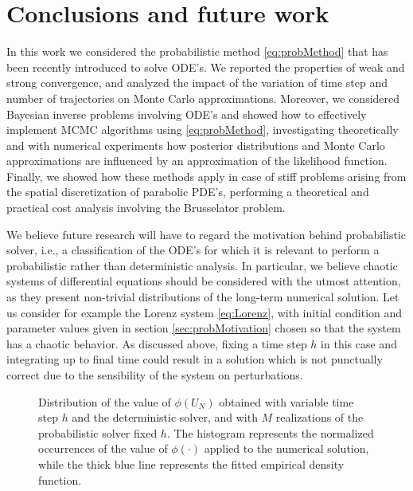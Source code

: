 \section{Conclusions and future work}

In this work we considered the probabilistic method \eqref{eq:probMethod} that has been recently introduced to solve ODE's. We reported the properties of weak and strong convergence, and analyzed the impact of the variation of time step and number of trajectories on Monte Carlo approximations. Moreover, we considered Bayesian inverse problems involving ODE's and showed how to effectively implement MCMC algorithms using \eqref{eq:probMethod}, investigating theoretically and with numerical experiments how posterior distributions and Monte Carlo approximations are influenced by an approximation of the likelihood function. Finally, we showed how these methods apply in case of stiff problems arising from the spatial discretization of parabolic PDE's, performing a theoretical and practical cost analysis involving the Brusselator problem.

We believe future research will have to regard the motivation behind probabilistic solver, i.e., a classification of the ODE's for which it is relevant to perform a probabilistic rather than deterministic analysis. In particular, we believe chaotic systems of differential equations should be considered with the utmost attention, as they present non-trivial distributions of the long-term numerical solution. Let us consider for example the Lorenz system \eqref{eq:Lorenz}, with initial condition and parameter values given in section \ref{sec:probMotivation} chosen so that the system has a chaotic behavior. As discussed above, fixing a time step $h$ in this case and integrating up to final time could result in a solution which is not punctually correct due to the sensibility of the system on perturbations. 

\begin{figure}[t]
	\begin{subfigure}{0.49\linewidth}
		\centering
		\resizebox{1.0\linewidth}{!}{}
	\end{subfigure}
	\begin{subfigure}{0.49\linewidth}
		\centering
		\resizebox{1.0\linewidth}{!}{}
	\end{subfigure}
	\caption{Distribution of the value of $\phi(U_N)$ obtained with variable time step $h$ and the deterministic solver, and with $M$ realizations of the probabilistic solver fixed $h$. The histogram represents the normalized occurrences of the value of $\phi(\cdot)$ applied to the numerical solution, while the thick blue line represents the fitted empirical density function.}
	\label{fig:densities}
\end{figure}

